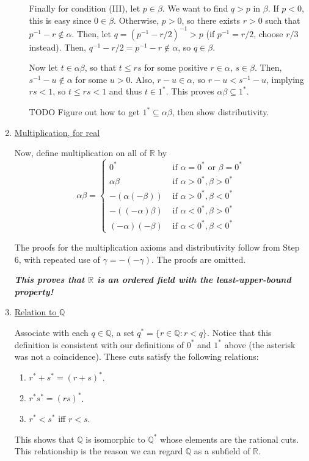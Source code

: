 \documentclass{scrbook}
\newcommand{\Q}{\mathbb{Q}}
\newcommand{\R}{\mathbb{R}}
\renewcommand{\underline}{\ul}
\begin{document}
\begin{enumerate}[Step 1.]
\begin{enumerate}[({M}1)]
Finally for condition (III), let $p \in \beta$. We want to find $q > p$ in $\beta$. If $p < 0$, this is easy since $0 \in \beta$. Otherwise, $p > 0$, so there exists $r > 0$ such that $p^{-1} - r \not\in \alpha$. Then, let $q = (p^{-1} - r/2)^{-1} > p$ (if $p^{-1} = r/2$, choose $r/3$ instead). Then, $q^{-1} - r/2 = p^{-1} - r \not\in \alpha$, so $q \in \beta$.

Now let $t \in \alpha\beta$, so that $t \le rs$ for some positive $r \in \alpha$, $s \in \beta$. Then, $s^{-1} - u \not\in \alpha$ for some $u > 0$. Also, $r - u \in \alpha$, so $r - u < s^{-1} - u$, implying $rs < 1$, so $t \le rs < 1$ and thus $t \in 1^*$. This proves $\alpha\beta \subseteq 1^*$. 

TODO Figure out how to get $1^* \subseteq \alpha\beta$, then show distributivity. 
\end{enumerate}

\item \underline{Multiplication, for real}

Now, define multiplication on all of $\R$ by
\[
	\alpha \beta = 
	\begin{cases}
		0^*	& \text{ if } \alpha = 0^* \text{ or } \beta = 0^* \\
		\alpha \beta & \text{ if } \alpha > 0^*, \beta > 0^* \\
		-(\alpha (-\beta)) & \text{ if } \alpha > 0^*, \beta < 0^* \\
		-((-\alpha) \beta) & \text{ if } \alpha < 0^*, \beta > 0^* \\
		(-\alpha)(-\beta) & \text{ if } \alpha < 0^*, \beta < 0^*
	\end{cases}
\]

The proofs for the multiplication axioms and distributivity follow from Step 6, with repeated use of $\gamma = -(-\gamma)$. The proofs are omitted.

\textbf{\textit{This proves that $\R$ is an ordered field with the least-upper-bound property!}}

\item \underline{Relation to $\Q$}

Associate with each $q \in \Q$, a set $q^* = \{r \in \Q : r < q\}$. Notice that this definition is consistent with our definitions of $0^*$ and $1^*$ above (the asterisk was not a coincidence). These cuts satisfy the following relations:

\begin{enumerate}
\item $r^* + s^* = (r + s)^*$.
\item $r^* s^* = (rs)^*$.
\item $r^* < s^*$ iff $r < s$.
\end{enumerate} 

This shows that $\Q$ is isomorphic to $\Q^*$ whose elements are the rational cuts. This relationship is the reason we can regard $\Q$ as a subfield of $\R$. 
\end{enumerate}
\end{document}
